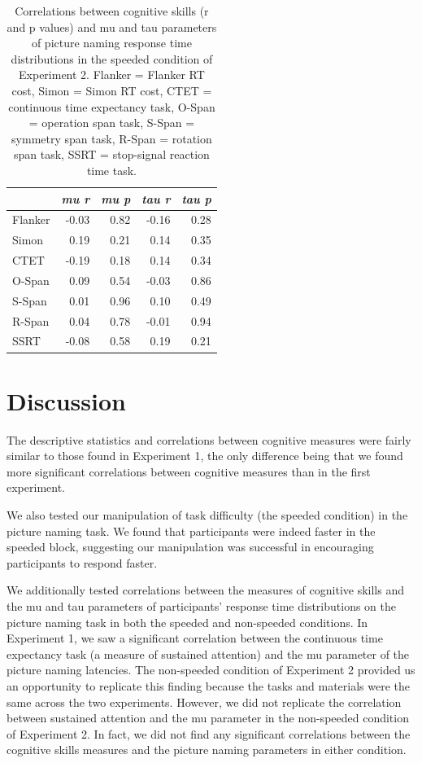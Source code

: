 \documentclass[
  man,floatsintext]{apa6}
\begin{document}
\begin{table}

\caption{\label{tab:cormutauE2s}Correlations between cognitive skills (r and p values) and mu and tau parameters of picture naming response time distributions in the speeded condition of Experiment 2. Flanker = Flanker RT cost, Simon = Simon RT cost, CTET = continuous time expectancy task, O-Span = operation span task, S-Span = symmetry span task, R-Span = rotation span task, SSRT = stop-signal reaction time task.}
\centering
\begin{tabular}[t]{lrrrr}
\toprule
\em{ } & \em{mu r} & \em{mu p} & \em{tau r} & \em{tau p}\\
\midrule
Flanker & -0.03 & 0.82 & -0.16 & 0.28\\
Simon & 0.19 & 0.21 & 0.14 & 0.35\\
CTET & -0.19 & 0.18 & 0.14 & 0.34\\
O-Span & 0.09 & 0.54 & -0.03 & 0.86\\
S-Span & 0.01 & 0.96 & 0.10 & 0.49\\
\addlinespace
R-Span & 0.04 & 0.78 & -0.01 & 0.94\\
SSRT & -0.08 & 0.58 & 0.19 & 0.21\\
\bottomrule
\end{tabular}
\end{table}

\hypertarget{discussion-1}{%
\section{Discussion}\label{discussion-1}}

The descriptive statistics and correlations between cognitive measures were fairly similar to those found in Experiment 1, the only difference being that we found more significant correlations between cognitive measures than in the first experiment.

We also tested our manipulation of task difficulty (the speeded condition) in the picture naming task. We found that participants were indeed faster in the speeded block, suggesting our manipulation was successful in encouraging participants to respond faster.

We additionally tested correlations between the measures of cognitive skills and the mu and tau parameters of participants' response time distributions on the picture naming task in both the speeded and non-speeded conditions. In Experiment 1, we saw a significant correlation between the continuous time expectancy task (a measure of sustained attention) and the mu parameter of the picture naming latencies. The non-speeded condition of Experiment 2 provided us an opportunity to replicate this finding because the tasks and materials were the same across the two experiments. However, we did not replicate the correlation between sustained attention and the mu parameter in the non-speeded condition of Experiment 2. In fact, we did not find any significant correlations between the cognitive skills measures and the picture naming parameters in either condition.
\end{document}
